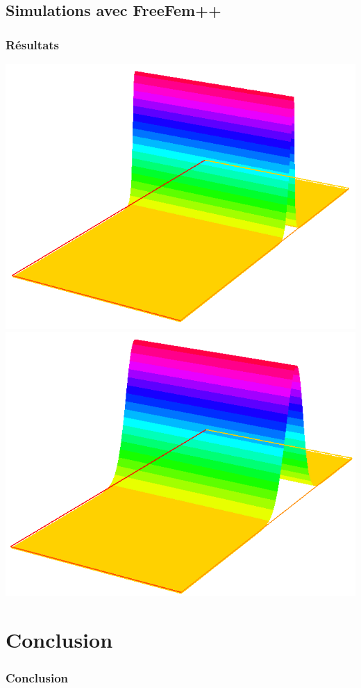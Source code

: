 \documentclass[handout]{beamer}
\begin{document}
\subsection[Simulation FF++]{Simulations avec FreeFem++}
\begin{frame}
	\frametitle{Résultats}
	\includegraphics[scale=0.22]{../images/capture1.png}
	\includegraphics[scale=0.22]{../images/capture6.png}
\end{frame}

\section*{Conclusion}
\begin{frame}
	\frametitle{Conclusion}
\end{frame}
\end{document}
